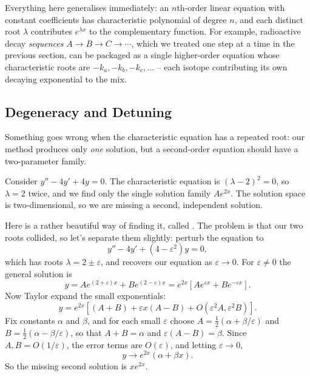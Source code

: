 \documentclass[a4paper]{scrartcl}
\begin{document}
\begin{remark}
	Everything here generalises immediately: an $n$th-order linear equation with constant coefficients has characteristic polynomial of degree $n$, and each distinct root $\lambda$ contributes $e^{\lambda x}$ to the complementary function. For example, radioactive decay \emph{sequences} $A \to B \to C \to \cdots$, which we treated one step at a time in the previous section, can be packaged as a single higher-order equation whose characteristic roots are $-k_a, -k_b, -k_c, \dots$ -- each isotope contributing its own decaying exponential to the mix.
\end{remark}

\subsection{Degeneracy and Detuning}

Something goes wrong when the characteristic equation has a repeated root: our method produces only \emph{one} solution, but a second-order equation should have a two-parameter family.

\begin{example}
	Consider $y'' - 4y' + 4y = 0$. The characteristic equation is $(\lambda - 2)^2 = 0$, so $\lambda = 2$ twice, and we find only the single solution family $Ae^{2x}$. The solution space is two-dimensional, so we are missing a second, independent solution.

	Here is a rather beautiful way of finding it, called . The problem is that our two roots collided, so let's separate them slightly: perturb the equation to
	$$
	y'' - 4y' + (4 - \varepsilon^2) y = 0,
	$$
	which has roots $\lambda = 2 \pm \varepsilon$, and recovers our equation as $\varepsilon \to 0$. For $\varepsilon \neq 0$ the general solution is
	$$
	y = A e^{(2 + \varepsilon)x} + B e^{(2 - \varepsilon)x} = e^{2x}\left[A e^{\varepsilon x} + B e^{-\varepsilon x}\right].
	$$
	Now Taylor expand the small exponentials:
	$$
	y = e^{2x}\left[(A + B) + \varepsilon x (A - B) + O(\varepsilon^2 A, \varepsilon^2 B)\right].
	$$
	Fix constants $\alpha$ and $\beta$, and for each small $\varepsilon$ choose $A = \frac{1}{2}(\alpha + \beta/\varepsilon)$ and $B = \frac{1}{2}(\alpha - \beta/\varepsilon)$, so that $A + B = \alpha$ and $\varepsilon(A - B) = \beta$. Since $A, B = O(1/\varepsilon)$, the error terms are $O(\varepsilon)$, and letting $\varepsilon \to 0$,
	$$
	y \to e^{2x} (\alpha + \beta x).
	$$
	So the missing second solution is $x e^{2x}$.
\end{example}
\end{document}
